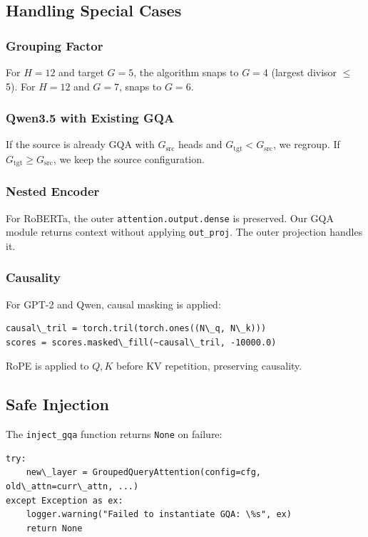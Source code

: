 \subsection{Handling Special Cases}

\subsubsection{Grouping Factor}

For $H = 12$ and target $G = 5$, the algorithm snaps to $G = 4$ (largest 
divisor $\le$ 5). For $H = 12$ and $G = 7$, snaps to $G = 6$.

\subsubsection{Qwen3.5 with Existing GQA}

If the source is already GQA with $G_\text{src}$ heads and $G_\text{tgt} < G_\text{src}$, 
we regroup. If $G_\text{tgt} \ge G_\text{src}$, we keep the source configuration.

\subsubsection{Nested Encoder}

For RoBERTa, the outer \texttt{attention.output.dense} is preserved. Our GQA module 
returns context without applying \texttt{out\_proj}. The outer projection handles it.

\subsubsection{Causality}

For GPT-2 and Qwen, causal masking is applied:

\begin{lstlisting}
causal\_tril = torch.tril(torch.ones((N\_q, N\_k)))
scores = scores.masked\_fill(~causal\_tril, -10000.0)
\end{lstlisting}

RoPE is applied to $Q, K$ before KV repetition, preserving causality.

\subsection{Safe Injection}

The \texttt{inject\_gqa} function returns \texttt{None} on failure:

\begin{lstlisting}
try:
    new\_layer = GroupedQueryAttention(config=cfg, old\_attn=curr\_attn, ...)
except Exception as ex:
    logger.warning("Failed to instantiate GQA: \%s", ex)
    return None
\end{lstlisting}

